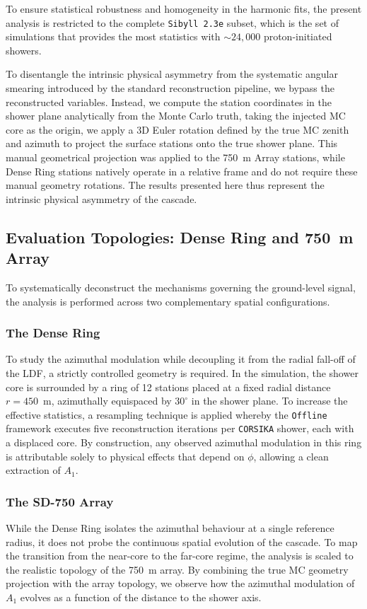 \documentclass[11pt,a4paper]{article}
\begin{document}
To ensure statistical robustness and homogeneity in the harmonic fits, the present analysis is restricted to the complete \texttt{Sibyll\,2.3e} subset, which is the set of simulations that provides the most statistics with $\sim24,000$ proton-initiated showers. 

To disentangle the intrinsic physical asymmetry from the systematic angular smearing introduced by the standard reconstruction pipeline, we bypass the reconstructed variables. Instead, we compute the station coordinates in the shower plane analytically from the Monte Carlo truth, taking the injected MC core as the origin, we apply a 3D Euler rotation defined by the true MC zenith and azimuth to project the surface stations onto the true shower plane. This manual geometrical projection was applied to the 750~m Array stations, while Dense Ring stations natively operate in a relative frame and do not require these manual geometry rotations. The results presented here thus represent the intrinsic physical asymmetry of the cascade.

\subsection{Evaluation Topologies: Dense Ring and 750~m Array}
\label{subsec:topologies}

To systematically deconstruct the mechanisms governing the ground-level signal, the analysis is performed across two complementary spatial configurations.

\subsubsection{The Dense Ring}
To study the azimuthal modulation while decoupling it from the radial fall-off of the LDF, a strictly controlled geometry is required. In the simulation, the shower core is surrounded by a ring of 12 stations placed at a fixed radial distance $r = 450$~m, azimuthally equispaced by $30^{\circ}$ in the shower plane. To increase the effective statistics, a resampling technique is applied whereby the \texttt{Offline} framework executes five reconstruction iterations per \texttt{CORSIKA} shower, each with a displaced core. By construction, any observed azimuthal modulation in this ring is attributable solely to physical effects that depend on $\phi$, allowing a clean extraction of $A_1$.

\subsubsection{The SD-750 Array}
While the Dense Ring isolates the azimuthal behaviour at a single reference radius, it does not probe the continuous spatial evolution of the cascade. To map the transition from the near-core to the far-core regime, the analysis is scaled to the realistic topology of the 750~m array. By combining the true MC geometry projection with the array topology, we observe how the azimuthal modulation of $A_1$ evolves as a function of the distance to the shower axis.
\end{document}
